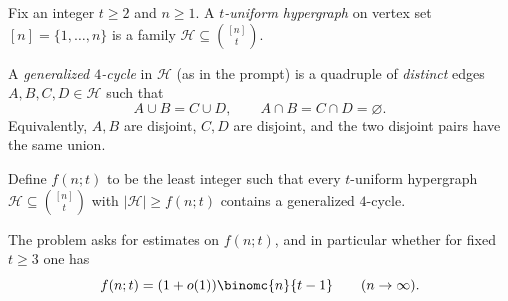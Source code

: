 Fix an integer $t\ge 2$ and $n\ge 1$.  A \emph{$t$-uniform hypergraph} on vertex set $[n]=\{1,\dots,n\}$ is a family $\mathcal H\subseteq \binom{[n]}{t}$.

A \emph{generalized $4$-cycle} in $\mathcal H$ (as in the prompt) is a quadruple of 
\emph{distinct} edges $A,B,C,D\in\mathcal H$ such that
\[
A\cup B=C\cup D,\qquad A\cap B=C\cap D=\varnothing.
\]
Equivalently, $A,B$ are disjoint, $C,D$ are disjoint, and the two disjoint pairs have the same union.

Define $f(n;t)$ to be the least integer such that every $t$-uniform hypergraph $\mathcal H\subseteq\binom{[n]}{t}$ with $|\mathcal H|\ge f(n;t)$ contains a generalized $4$-cycle.

The problem asks for estimates on $f(n;t)$, and in particular whether for fixed $t\ge 3$ one has
\[
 f(n;t) = (1+o(1))\binomc{n}{t-1}\qquad (n\to\infty).
\]
